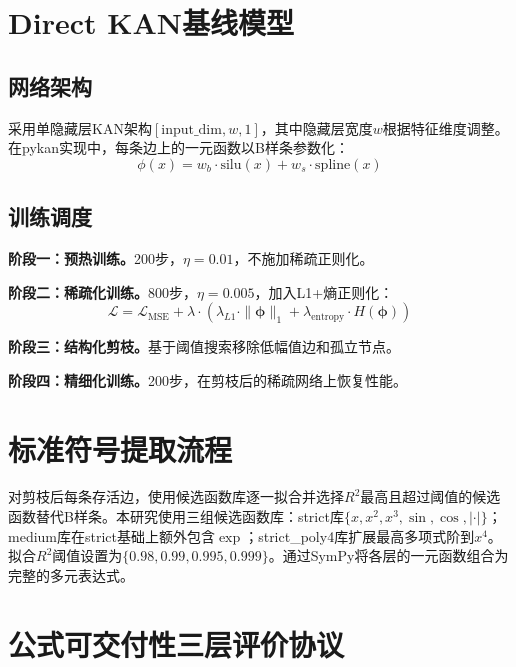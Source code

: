\documentclass[12pt,a4paper,oneside]{ctexbook}
\begin{document}
\section{Direct KAN基线模型}

\subsection{网络架构}

采用单隐藏层KAN架构$[\text{input\_dim}, w, 1]$，其中隐藏层宽度$w$根据特征维度调整。在pykan\cite{liu2025kan}实现中，每条边上的一元函数以B样条参数化：
\begin{equation}
\phi(x) = w_b \cdot \text{silu}(x) + w_s \cdot \text{spline}(x)
\end{equation}

\subsection{训练调度}

\textbf{阶段一：预热训练。}200步，$\eta = 0.01$，不施加稀疏正则化。

\textbf{阶段二：稀疏化训练。}800步，$\eta = 0.005$，加入L1+熵正则化：
\begin{equation}
\mathcal{L} = \mathcal{L}_{\text{MSE}} + \lambda \cdot \left(\lambda_{L1} \cdot \|\boldsymbol{\phi}\|_1 + \lambda_{\text{entropy}} \cdot H(\boldsymbol{\phi})\right)
\end{equation}

\textbf{阶段三：结构化剪枝。}基于阈值搜索移除低幅值边和孤立节点。

\textbf{阶段四：精细化训练。}200步，在剪枝后的稀疏网络上恢复性能。

\section{标准符号提取流程}

对剪枝后每条存活边，使用候选函数库逐一拟合并选择$R^2$最高且超过阈值的候选函数替代B样条。本研究使用三组候选函数库：strict库$\{x, x^2, x^3, \sin, \cos, |\cdot|\}$；medium库在strict基础上额外包含$\exp$；strict\_poly4库扩展最高多项式阶到$x^4$。拟合$R^2$阈值设置为$\{0.98, 0.99, 0.995, 0.999\}$。通过SymPy将各层的一元函数组合为完整的多元表达式。

\section{公式可交付性三层评价协议}
\label{sec:deliverability}
\end{document}
